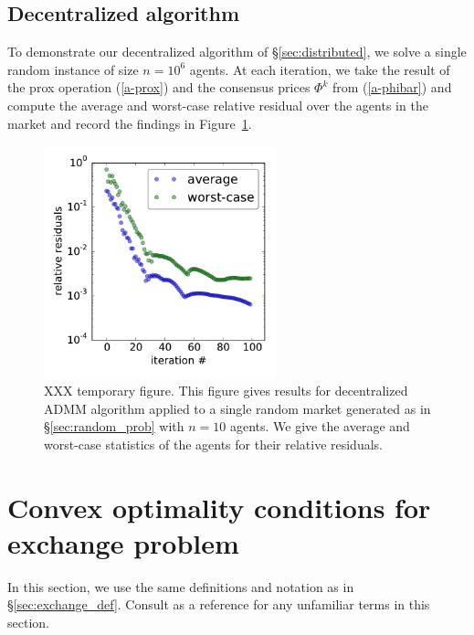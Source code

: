 \documentclass[12pt]{article}
\begin{document}
\subsection{Decentralized algorithm}

To demonstrate our decentralized algorithm of \S\ref{sec:distributed},
we solve a single random instance of size $n=10^6$ agents. At each iteration,
we take the result of the prox operation (\ref{a-prox}) and the consensus
prices $\Phi^k$ from (\ref{a-phibar}) and compute the average and worst-case
relative residual over the agents in the market and record the findings in
Figure~\ref{f-admm}.

\begin{figure}
\begin{center}
\includegraphics[width=0.6\textwidth]{figures/admm}
\end{center}
\caption{XXX temporary figure. This figure gives results for decentralized ADMM
algorithm applied to a single random market generated as in
\S\ref{sec:random_prob} with $n=10$ agents. We give the average and worst-case
statistics of the agents for their relative residuals.}
\label{f-admm}
\end{figure}


\appendix


\section{Convex optimality conditions for exchange problem}
\label{sec:exchange_proof}

In this section, we use the same definitions and notation as in
\S\ref{sec:exchange_def}.
Consult \cite{BoV:04} as a reference for any
unfamiliar terms in this section.
\end{document}
